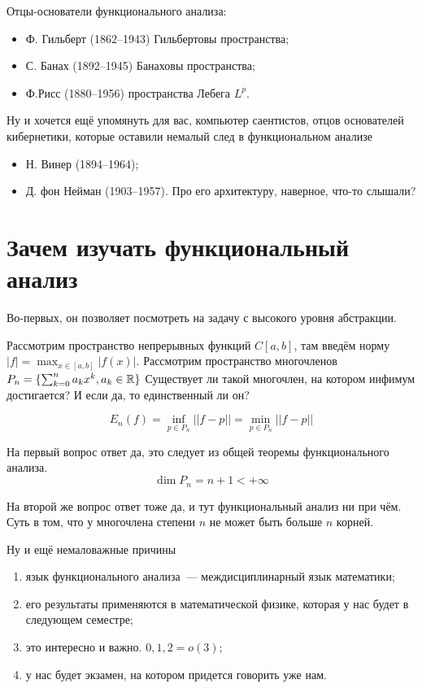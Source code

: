 \documentclass[document]{subfiles}
\begin{document}
Отцы-основатели функционального анализа:
\begin{itemize}
    \item Ф. Гильберт (1862--1943) Гильбертовы пространства;
    \item С. Банах (1892--1945) Банаховы пространства;
    \item Ф.Рисс (1880--1956) пространства Лебега $L^p$.
\end{itemize}
Ну и хочется ещё упомянуть для вас, компьютер саентистов, отцов основателей кибернетики, которые оставили немалый след в функциональном анализе
\begin{itemize}
    \item Н. Винер (1894--1964);
    \item Д. фон Нейман (1903--1957). Про его архитектуру, наверное, что-то слышали?
\end{itemize}

\section{Зачем изучать функциональный анализ}
Во-первых, он позволяет посмотреть на задачу с высокого уровня абстракции.

Рассмотрим пространство непрерывных функций $C[a,b]$, там введём норму $|f| = \max_{x \in [a,b]} | f(x)|.$ Рассмотрим пространство многочленов $P_n = \{ \sum^n_{k=0} a_kx^k, a_k \in \mathbb{R} \}$
Существует ли такой многочлен, на котором инфимум достигается? И если да, то единственный ли он? 

\[ E_n (f) = \inf_{p \in P_n} || f - p||  = \min_{p \in P_n} ||f - p|| \]


На первый вопрос ответ да, это следует из общей теоремы функционального анализа. 
\[ \dim P_n = n + 1 < + \infty \]

На второй же вопрос ответ тоже да, и тут функциональный анализ ни при чём. Суть в том, что у многочлена степени $n$ не может быть больше $n$ корней.

Ну и ещё немаловажные причины
\begin{enumerate}
    \item язык функционального анализа~--- междисциплинарный язык математики;
    \item его результаты применяются в математической физике, которая у нас будет в следующем семестре;
    \item это интересно и важно.  $0,1,2 = o(3)$;
    \item у нас будет экзамен, на котором придется говорить уже нам.
\end{enumerate}
\end{document}
